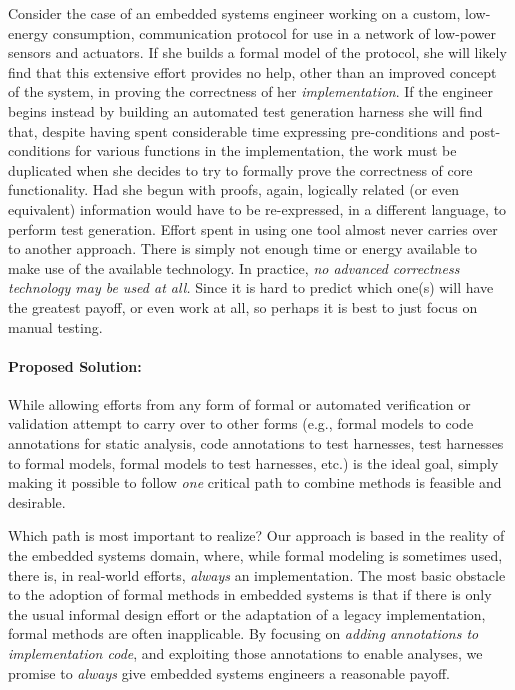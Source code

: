 Consider the case of an embedded systems engineer working on a custom, low-energy consumption, communication protocol for use in a network of low-power sensors and actuators.  If she builds a formal model of the protocol, she will likely find that this extensive effort provides no help, other than an improved concept of the system, in proving the correctness of her \emph{implementation}.  If the engineer begins instead by building an automated test generation harness she will find that, despite having spent considerable time expressing pre-conditions and post-conditions for various functions in the implementation, the work must be duplicated when she decides to try to formally prove the correctness of core functionality.  Had she begun with proofs, again, logically related (or even equivalent) information would have to be re-expressed, in a different language, to perform test generation.  Effort spent in using one tool almost never carries over to another approach.  There is simply not enough time or energy available to make use of the available technology.  In practice, \emph{no advanced correctness technology may be used at all.}  Since it is hard to predict which one(s) will have the greatest payoff, or even work at all, so perhaps it is best to just focus on manual testing.


\paragraph {Proposed Solution:} While allowing efforts from any form of formal or automated verification or validation attempt to carry over to other forms (e.g., formal models to code annotations for static analysis, code annotations to test harnesses, test harnesses to formal models, formal models to test harnesses, etc.) is the ideal goal, simply making it possible to follow \emph{one} critical path to combine methods is feasible and desirable.

Which path is most important to realize?  Our approach is based in the reality of the embedded systems domain, where, while formal modeling is sometimes used, there is, in real-world efforts, \emph{always} an implementation.  The most basic obstacle to the adoption of formal methods in embedded systems is that if there is only the usual informal design effort or the adaptation of a legacy implementation, formal methods are often inapplicable.  By focusing on \emph{adding annotations to implementation code}, and exploiting those annotations to enable analyses, we promise to \emph{always} give embedded systems engineers a reasonable payoff.

